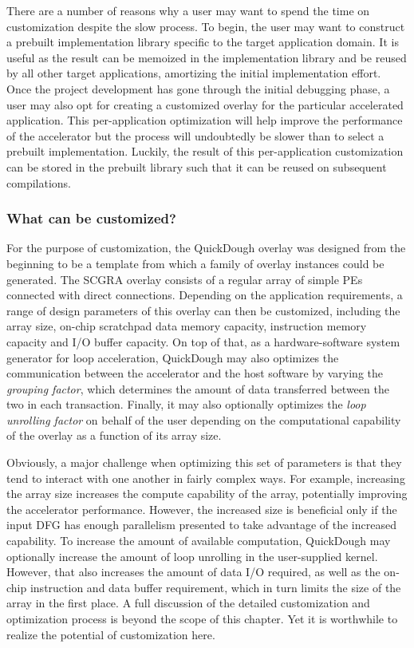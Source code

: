 There are a number of reasons why a user may want to spend the time on customization despite the slow process.
To begin, the user may want to construct a prebuilt implementation library specific to the target application domain. 
It is useful as the result can be memoized in the implementation library and be reused by all other target applications, amortizing the initial implementation effort.
Once the project development has gone through the initial debugging phase, a user may also opt for creating a customized overlay for the particular accelerated application.
This per-application optimization will help improve the performance of the accelerator but the process will undoubtedly be slower than to select a prebuilt implementation.
Luckily, the result of this per-application customization can be stored in the prebuilt library such that it can be reused on subsequent compilations.

\subsubsection{What can be customized?}
For the purpose of customization, the QuickDough overlay was designed from the beginning to be a template from which a family of overlay instances could be generated.
The SCGRA overlay consists of a regular array of simple PEs connected with direct connections.
Depending on the application requirements, a range of design parameters of this overlay can then be customized, including the array size, on-chip scratchpad data memory capacity, instruction memory capacity and I/O buffer capacity.
On top of that, as a hardware-software system generator for loop acceleration, QuickDough may also optimizes the communication between the accelerator and the host software by varying the \emph{grouping factor}, which determines the amount of data transferred between the two in each transaction.
Finally, it may also optionally optimizes the \emph{loop unrolling factor} on behalf of the user depending on the computational capability of the overlay as a function of its array size.

Obviously, a major challenge when optimizing this set of parameters is that they tend to interact with one another in fairly complex ways.
For example, increasing the array size increases the compute capability of the array, potentially improving the accelerator performance.  However, the increased size is beneficial only if the input DFG has enough parallelism presented to take advantage of the increased capability.
To increase the amount of available computation, QuickDough may optionally increase the amount of loop unrolling in the user-supplied kernel.
However, that also increases the amount of data I/O required, as well as the on-chip instruction and data buffer requirement, which in turn limits the size of the array in the first place.
A full discussion of the detailed customization and optimization process is beyond the scope of this chapter.  Yet it is worthwhile to realize the potential of customization here.

